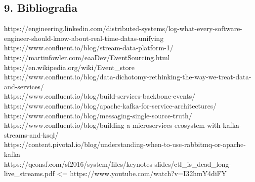 \documentclass[]{article}
\begin{document}
\newpage

\subsection{9. Bibliografia}\label{bibliografia}

https://engineering.linkedin.com/distributed-systems/log-what-every-software-engineer-should-know-about-real-time-datas-unifying
https://www.confluent.io/blog/stream-data-platform-1/
https://martinfowler.com/eaaDev/EventSourcing.html\\
https://en.wikipedia.org/wiki/Event\_store\\
https://www.confluent.io/blog/data-dichotomy-rethinking-the-way-we-treat-data-and-services/\\
https://www.confluent.io/blog/build-services-backbone-events/\\
https://www.confluent.io/blog/apache-kafka-for-service-architectures/\\
https://www.confluent.io/blog/messaging-single-source-truth/\\
https://www.confluent.io/blog/building-a-microservices-ecosystem-with-kafka-streams-and-ksql/\\
https://content.pivotal.io/blog/understanding-when-to-use-rabbitmq-or-apache-kafka\\
https://qconsf.com/sf2016/system/files/keynotes-slides/etl\_is\_dead\_long-live\_streams.pdf
\textless{}= https://www.youtube.com/watch?v=I32hmY4diFY
\end{document}
